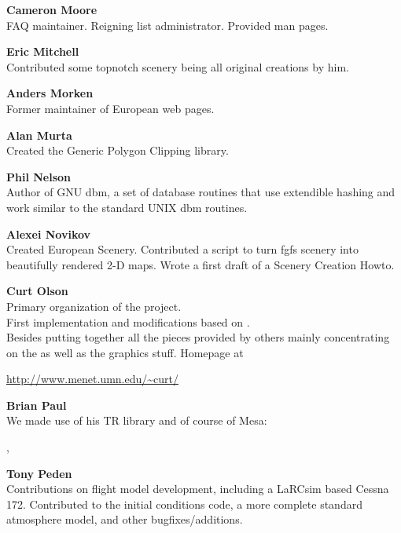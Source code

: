  \medskip

\noindent \textbf{Cameron Moore}\\
 FAQ maintainer. Reigning list administrator. Provided man pages.
 \medskip

\noindent \textbf{Eric Mitchell}\\
  Contributed some topnotch scenery  being all original creations by him.
 \medskip

\noindent \textbf{Anders Morken}\\
  Former maintainer of European web pages.
  \medskip

\noindent \textbf{Alan Murta}\\
  Created the Generic Polygon Clipping library.
 \medskip

   \medskip

\noindent \textbf{Phil Nelson}\\
  Author of GNU dbm, a set of database routines that use extendible hashing and work
  similar to the standard UNIX dbm routines.
  \medskip

\noindent \textbf{Alexei Novikov}\\
  Created European Scenery. Contributed a script to turn fgfs scenery into beautifully rendered
  2-D maps. Wrote a first draft of a Scenery Creation Howto.
  \medskip

\noindent \textbf{Curt Olson}\\
 Primary organization of the project.\\
 First implementation and modifications based on .\\
 Besides putting together all the pieces provided by others mainly concentrating on the  as well as the graphics stuff. Homepage at

 \href{http://www.menet.umn.edu/~curt/}{http://www.menet.umn.edu/\~{}curt/}
 \medskip

\noindent \textbf{Brian Paul}\\
 We made use of his TR library and of course of Mesa:

 , 
 \medskip

\noindent \textbf{Tony Peden}\\
  Contributions on flight model development, including a LaRCsim based
  Cessna 172. Contributed to  {\JSBSim} the initial conditions code, a more complete
  standard atmosphere model, and other bugfixes/additions.
  \medskip


